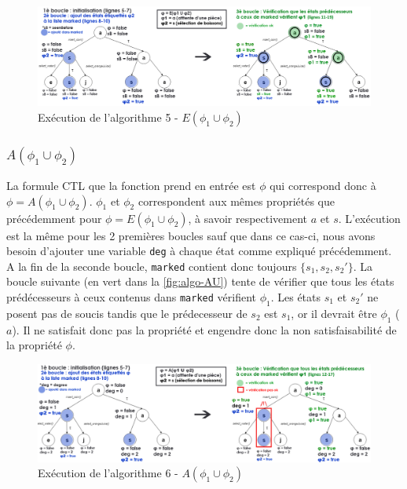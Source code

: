 \documentclass[runningheads,a4paper,10pt]{llncs}
\begin{document}
\begin{figure}
  \centering
   \includegraphics[scale=0.38]{figures/algo-EU.png}
   \caption[Caption for LOF]{Exécution de l'algorithme 5 - $E(\phi_{1} \cup \phi_{2})$}
   \label{fig:algo-EU}
\end{figure} 


\subsubsection{$A(\phi_{1} \cup \phi_{2})$}

La formule CTL que la fonction prend en entrée est $\phi$ qui correspond donc à $\phi = A(\phi_{1} \cup \phi_{2})$. $\phi_{1}$ et $\phi_{2}$ correspondent aux mêmes propriétés que précédemment pour $\phi = E(\phi_{1} \cup \phi_{2})$, à savoir respectivement $a$ et $s$. L'exécution est la même pour les 2 premières boucles sauf que dans ce cas-ci, nous avons besoin d'ajouter une variable \texttt{deg} à chaque état comme expliqué précédemment. A la fin de la seconde boucle, \texttt{marked} contient donc toujours $\{s_{1}, s_{2}, s_{2}'\}$. La boucle suivante (en vert dans la \autoref{fig:algo-AU}) tente de vérifier que tous les états prédécesseurs à ceux contenus dans \texttt{marked} vérifient $\phi_{1}$. Les états $s_{1}$ et $s_{2}'$ ne posent pas de soucis tandis que le prédecesseur de $s_{2}$ est $s_{1}$, or il devrait être $\phi_{1}$ ($a$). Il ne satisfait donc pas la propriété et engendre donc la non satisfaisabilité de la propriété $\phi$. 


\begin{figure}
  \centering
   \includegraphics[scale=0.38]{figures/algo-AU.png}
   \caption[Caption for LOF]{Exécution de l'algorithme 6 - $A(\phi_{1} \cup \phi_{2})$}
   \label{fig:algo-AU}
\end{figure} 
\end{document}
